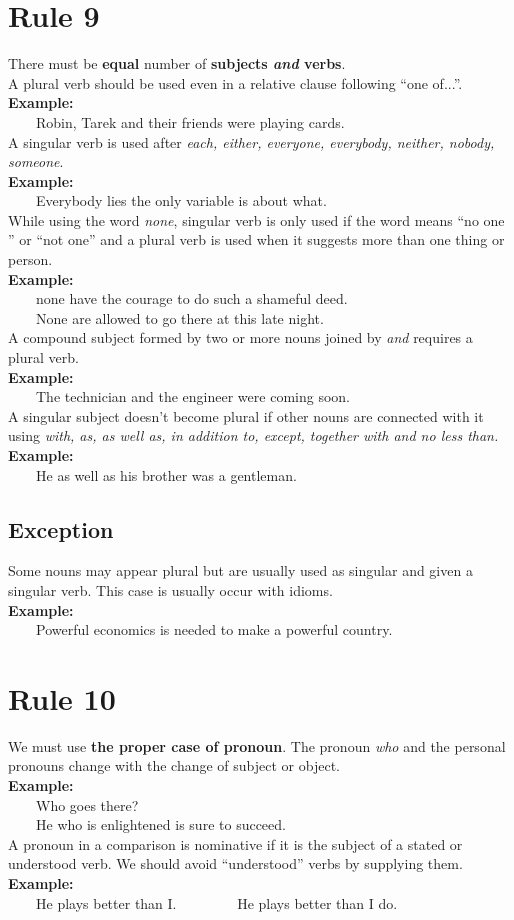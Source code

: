\documentclass{report}
\newcommand{\xmpl}{\textbf{Example:}\\} %
\newcommand{\indnt}{\ \ \ \ } %
\begin{document}
\section{Rule 9}
There must be \textbf{equal} number of \textbf{subjects \emph{and} verbs}.\\ 
A plural verb should be used even in a relative clause following ``one of...''.\\
\xmpl
\indnt Robin, Tarek and their friends were playing cards.\\
A singular verb is used after \emph{each, either, everyone, everybody, neither, nobody, someone}.\\
\xmpl
\indnt Everybody lies the only variable is about what.\\
While using the word \emph{none}, singular verb is only used if the word means ``no one '' or ``not one'' and a plural verb is used when it suggests more than one thing or person.\\
\xmpl
\indnt none have the courage to do such a shameful deed.\\
\indnt None are allowed to go there at this late night.\\
A compound subject formed by two or more nouns joined by \emph{and} requires a plural verb.\\
\xmpl
\indnt The technician and the engineer were coming soon.\\
A singular subject doesn't become plural if other nouns are connected with it using \emph{with, as, as well as, in addition to, except, together with \emph{and} no less than.}\\
\xmpl
\indnt He as well as his brother was a gentleman.\\
\subsection{Exception}
Some nouns may appear plural but are usually used as singular and given a singular verb. This case is usually occur with idioms.\\
\textbf{Example:}\\
\indnt Powerful economics is needed to make a powerful country.

\section{Rule 10}
We must use \textbf{the proper case of pronoun}. The pronoun \textit{who} and the personal pronouns change with the change of subject or object.\\
\xmpl
\indnt Who goes there?\\
\indnt He who is enlightened is sure to succeed.\\
A pronoun in a comparison is nominative if it is the subject of a stated or understood verb. We should avoid ``understood'' verbs by supplying them.
\xmpl
\indnt He plays better than I. \indnt \indnt He plays better than I do.
\end{document}

